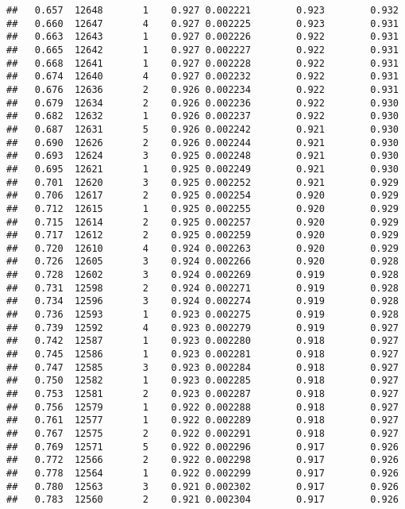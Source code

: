 \documentclass[
]{book}
\begin{document}
\begin{verbatim}
##   0.657  12648       1    0.927 0.002221        0.923        0.932
##   0.660  12647       4    0.927 0.002225        0.923        0.931
##   0.663  12643       1    0.927 0.002226        0.922        0.931
##   0.665  12642       1    0.927 0.002227        0.922        0.931
##   0.668  12641       1    0.927 0.002228        0.922        0.931
##   0.674  12640       4    0.927 0.002232        0.922        0.931
##   0.676  12636       2    0.926 0.002234        0.922        0.931
##   0.679  12634       2    0.926 0.002236        0.922        0.930
##   0.682  12632       1    0.926 0.002237        0.922        0.930
##   0.687  12631       5    0.926 0.002242        0.921        0.930
##   0.690  12626       2    0.926 0.002244        0.921        0.930
##   0.693  12624       3    0.925 0.002248        0.921        0.930
##   0.695  12621       1    0.925 0.002249        0.921        0.930
##   0.701  12620       3    0.925 0.002252        0.921        0.929
##   0.706  12617       2    0.925 0.002254        0.920        0.929
##   0.712  12615       1    0.925 0.002255        0.920        0.929
##   0.715  12614       2    0.925 0.002257        0.920        0.929
##   0.717  12612       2    0.925 0.002259        0.920        0.929
##   0.720  12610       4    0.924 0.002263        0.920        0.929
##   0.726  12605       3    0.924 0.002266        0.920        0.928
##   0.728  12602       3    0.924 0.002269        0.919        0.928
##   0.731  12598       2    0.924 0.002271        0.919        0.928
##   0.734  12596       3    0.924 0.002274        0.919        0.928
##   0.736  12593       1    0.923 0.002275        0.919        0.928
##   0.739  12592       4    0.923 0.002279        0.919        0.927
##   0.742  12587       1    0.923 0.002280        0.918        0.927
##   0.745  12586       1    0.923 0.002281        0.918        0.927
##   0.747  12585       3    0.923 0.002284        0.918        0.927
##   0.750  12582       1    0.923 0.002285        0.918        0.927
##   0.753  12581       2    0.923 0.002287        0.918        0.927
##   0.756  12579       1    0.922 0.002288        0.918        0.927
##   0.761  12577       1    0.922 0.002289        0.918        0.927
##   0.767  12575       2    0.922 0.002291        0.918        0.927
##   0.769  12571       5    0.922 0.002296        0.917        0.926
##   0.772  12566       2    0.922 0.002298        0.917        0.926
##   0.778  12564       1    0.922 0.002299        0.917        0.926
##   0.780  12563       3    0.921 0.002302        0.917        0.926
##   0.783  12560       2    0.921 0.002304        0.917        0.926

\end{verbatim}
\end{document}
